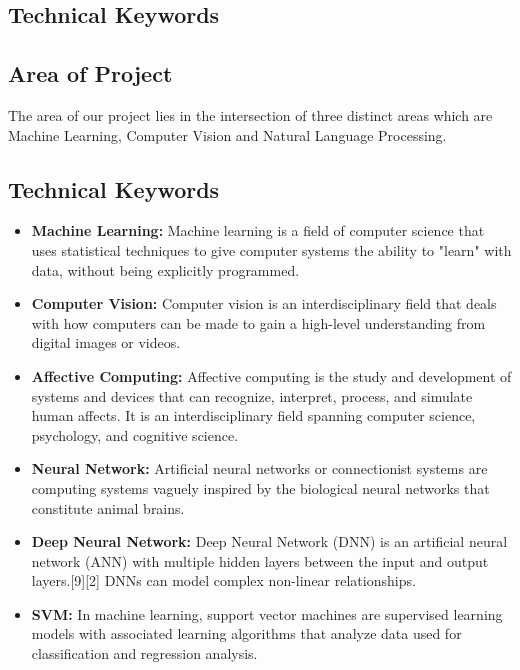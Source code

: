 \documentclass[oneside,a4paper,12pt]{report}
\begin{document}
\begin{normalsize}
\chapter{Technical Keywords}

\section{Area of Project}
\begin{center}
	The area of our project lies in the intersection of three distinct areas which are Machine Learning, Computer Vision and Natural Language Processing.
\end{center}

\section{Technical Keywords}

 \begin{itemize}
   \item 	\textbf{Machine Learning: } Machine learning is a field of computer science that uses statistical techniques to give computer systems the ability to "learn" with data, without being explicitly programmed.
 \item \textbf{Computer Vision: } Computer vision is an interdisciplinary field that deals with how computers can be made to gain a high-level understanding from digital images or videos.
 \item	\textbf{Affective Computing: } Affective computing is the study and development of systems and devices that can recognize, interpret, process, and simulate human affects. It is an interdisciplinary field spanning computer science, psychology, and cognitive science.
 \item \textbf{Neural Network: } Artificial neural networks or connectionist systems are computing systems vaguely inspired by the biological neural networks that constitute animal brains.
 
 \item \textbf{Deep Neural Network: } Deep Neural Network (DNN) is an artificial neural network (ANN) with multiple hidden layers between the input and output layers.[9][2] DNNs can model complex non-linear relationships.
 
 
 \item \textbf{SVM: } In machine learning, support vector machines are supervised learning models with associated learning algorithms that analyze data used for classification and regression analysis.
 

\end{itemize}
\end{normalsize}
\end{document}
